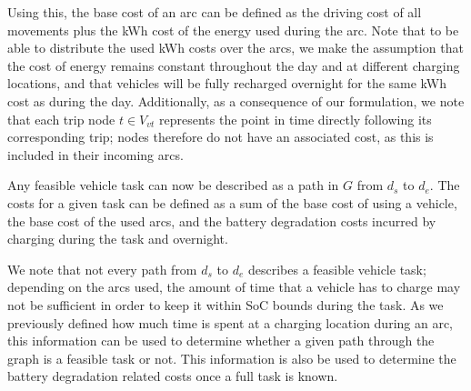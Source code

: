 \documentclass[]{article}
\begin{document}
Using this, the base cost of an arc can be defined as the driving cost of all movements plus the kWh cost of the energy used during the arc. Note that to be able to distribute the used kWh costs over the arcs, we make the assumption that the cost of energy remains constant throughout the day and at different charging locations, and that vehicles will be fully recharged overnight for the same kWh cost as during the day. Additionally, as a consequence of our formulation, we note that each trip node $t \in V_{vt}$ represents the point in time directly following its corresponding trip; nodes therefore do not have an associated cost, as this is included in their incoming arcs. 

Any feasible vehicle task can now be described as a path in $G$ from $d_s$ to $d_e$. The costs for a given task can be defined as a sum of the base cost of using a vehicle, the base cost of the used arcs, and the battery degradation costs incurred by charging during the task and overnight.

We note that not every path from $d_s$ to $d_e$ describes a feasible vehicle task; depending on the arcs used, the amount of time that a vehicle has to charge may not be sufficient in order to keep it within SoC bounds during the task. As we previously defined how much time is spent at a charging location during an arc, this information can be used to determine whether a given path through the graph is a feasible task or not. This information is also be used to determine the battery degradation related costs once a full task is known.
\end{document}
